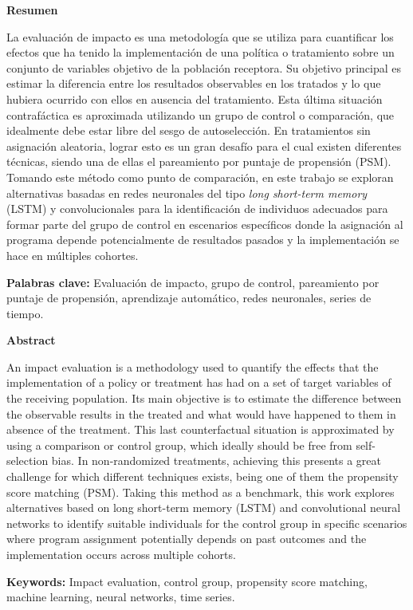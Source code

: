 \documentclass[../main.tex]{subfiles}
\begin{document}
\noindent \textbf{Resumen}

La evaluación de impacto es una metodología que se utiliza para cuantificar los efectos
que ha tenido la implementación de una política o tratamiento sobre un conjunto de
variables objetivo de la población receptora. Su objetivo principal es estimar la
diferencia entre los resultados observables en los tratados y lo que hubiera ocurrido con
ellos en ausencia del tratamiento. Esta última situación contrafáctica es aproximada
utilizando un grupo de control o comparación, que idealmente debe estar libre del sesgo de
autoselección. En tratamientos sin asignación aleatoria, lograr esto es un gran desafío
para el cual existen diferentes técnicas, siendo una de ellas el pareamiento por puntaje
de propensión (PSM). Tomando este método como punto de comparación, en este trabajo se
exploran alternativas basadas en redes neuronales del tipo \textit{long short-term memory}
(LSTM) y convolucionales para la identificación de individuos adecuados para formar parte
del grupo de control en escenarios específicos donde la asignación al programa depende
potencialmente de resultados pasados y la implementación se hace en múltiples cohortes.

\medskip

\noindent \textbf{Palabras clave: } Evaluación de impacto, grupo de control, pareamiento
por puntaje de propensión, aprendizaje automático, redes neuronales, series de tiempo.

\bigskip
\bigskip

\noindent \textbf{Abstract}

An impact evaluation is a methodology used to quantify the effects that the implementation
of a policy or treatment has had on a set of target variables of the receiving population.
Its main objective is to estimate the difference between the observable results in the
treated and what would have happened to them in absence of the treatment. This last
counterfactual situation is approximated by using a comparison or control group, which
ideally should be free from self-selection bias. In non-randomized treatments, achieving
this presents a great challenge for which different techniques exists, being one of them
the propensity score matching (PSM). Taking this method as a benchmark, this work explores
alternatives based on long short-term memory (LSTM) and convolutional neural networks to
identify suitable individuals for the control group in specific scenarios where program
assignment potentially depends on past outcomes and the implementation occurs across
multiple cohorts.

\medskip

\noindent \textbf{Keywords: } Impact evaluation, control group, propensity score matching,
machine learning, neural networks, time series.
\end{document}
